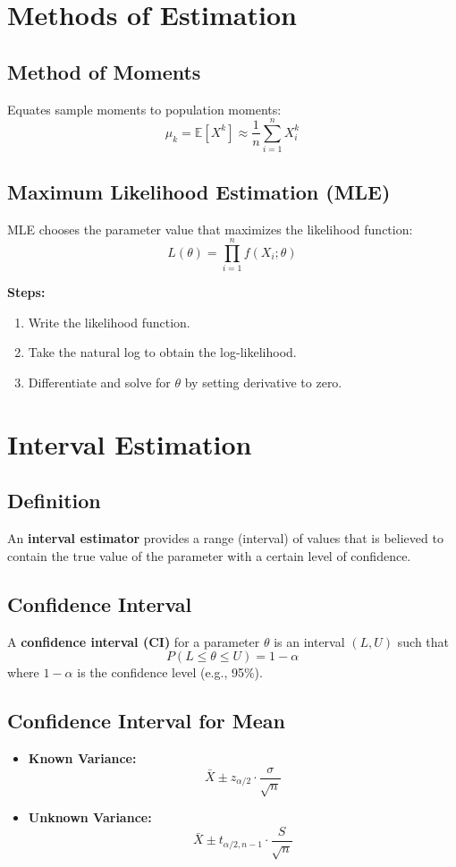 \documentclass[twoside]{book}
\begin{document}
\section{Methods of Estimation}
\subsection{Method of Moments}
Equates sample moments to population moments:
\[
\mu_k = \mathbb{E}[X^k] \approx \frac{1}{n} \sum_{i=1}^n X_i^k
\]

\subsection{Maximum Likelihood Estimation (MLE)}
MLE chooses the parameter value that maximizes the likelihood function:
\[
L(\theta) = \prod_{i=1}^n f(X_i;\theta)
\]

\textbf{Steps:}
\begin{enumerate}
    \item Write the likelihood function.
    \item Take the natural log to obtain the log-likelihood.
    \item Differentiate and solve for \( \theta \) by setting derivative to zero.
\end{enumerate}

\section{Interval Estimation}
\subsection{Definition}
An \textbf{interval estimator} provides a range (interval) of values that is believed to contain the true value of the parameter with a certain level of confidence.

\subsection{Confidence Interval}
A \textbf{confidence interval (CI)} for a parameter \( \theta \) is an interval \( (L, U) \) such that
\[
P(L \leq \theta \leq U) = 1 - \alpha
\]
where \( 1 - \alpha \) is the confidence level (e.g., 95\%).

\subsection{Confidence Interval for Mean}
\begin{itemize}
    \item \textbf{Known Variance:}
    \[
    \bar{X} \pm z_{\alpha/2} \cdot \frac{\sigma}{\sqrt{n}}
    \]

    \item \textbf{Unknown Variance:}
    \[
    \bar{X} \pm t_{\alpha/2, n-1} \cdot \frac{S}{\sqrt{n}}
    \]
\end{itemize}
\end{document}
